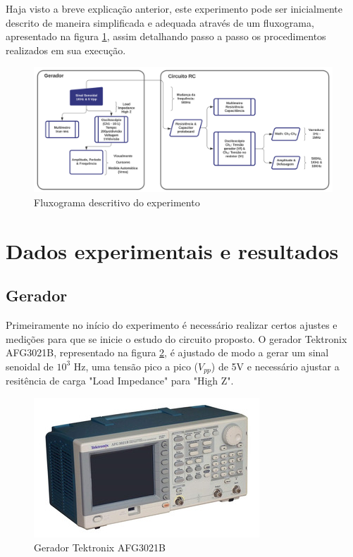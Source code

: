 \documentclass[a4paper,12pt,onecolumn]{article}
\numberwithin{equation}{section}
\numberwithin{figure}{section}
\begin{document}
Haja visto a breve explicação anterior, este experimento pode ser inicialmente descrito de maneira simplificada e adequada através de um fluxograma, apresentado na figura \ref{flux}, assim detalhando passo a passo os procedimentos realizados em sua execução.

\begin{figure}[H]
  \centering
  \includegraphics[scale=0.65]{fluxograma.png}
  \caption{Fluxograma descritivo do experimento}
  \label{flux}
\end{figure}


\newpage
\section{Dados experimentais e resultados}
\subsection{Gerador}
Primeiramente no início do experimento é necessário realizar certos ajustes e medições para que se inicie o estudo do circuito proposto. O gerador Tektronix AFG3021B, representado na figura \ref{ger}, é ajustado  de modo a gerar um sinal senoidal de $10^{3}$ Hz, uma tensão pico a pico ($V_{pp}$) de 5V e necessário ajustar a resitência de carga "Load Impedance" para "High Z".

\begin{figure}[H]
  \centering
  \includegraphics[scale=0.6]{ger.png}
  \caption{Gerador Tektronix AFG3021B}
  \label{ger}
\end{figure}
\end{document}
